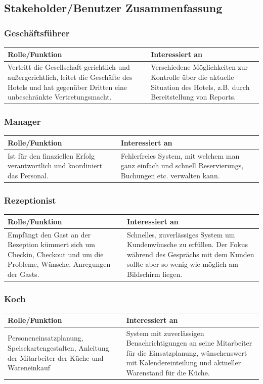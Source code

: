 \documentclass[10pt,a4paper,titlepage]{article}
\begin{document}
\subsection{Stakeholder\slash{}Benutzer Zusammenfassung}
\subsubsection{Geschäftsführer}
\begin{tabular}[t]{|p{5cm}|p{5cm}|}
    \hline
    \textbf{Rolle\slash{}Funktion} & \textbf{Interessiert an} \\
    \hline
Vertritt die Gesellschaft gerichtlich und außergerichtlich, leitet die Geschäfte des Hotels und hat gegenüber Dritten eine unbeschränkte Vertretungsmacht. &
    Verschiedene Möglichkeiten zur Kontrolle über die aktuelle Situation des Hotels, z.B. durch Bereitstellung von \Glspl{Report}.\\
    \hline
\end{tabular}
\subsubsection{Manager}
\begin{tabular}[t]{|p{5cm}|p{5cm}|}
    \hline
    \textbf{Rolle\slash{}Funktion} & \textbf{Interessiert an} \\
    \hline
Ist für den finaziellen Erfolg verantwortlich und koordiniert das Personal. &
	Fehlerfreies System, mit welchem man ganz einfach und schnell \Glspl{Reservierung}, Buchungen etc. verwalten kann. \\
    \hline
\end{tabular}
\subsubsection{\Gls{Rezeptionist}}
\begin{tabular}[t]{|p{5cm}|p{5cm}|}
    \hline
    \textbf{Rolle\slash{}Funktion} & \textbf{Interessiert an} \\
    \hline
Empfängt den \Gls{Gast} an der \Gls{Rezeption} kümmert sich um \Gls{Checkin}, \Gls{Checkout} und um die Probleme, Wünsche, Anregungen der \Glspl{Gast}. &
	Schnelles, zuverlässiges System um Kundenwünsche zu erfüllen. Der Fokus während des Gesprächs mit dem \Gls{Kunde}n sollte aber so wenig wie möglich am Bildschirm liegen. \\
    \hline
\end{tabular}
\subsubsection{Koch}
\begin{tabular}[t]{|p{5cm}|p{5cm}|}
    \hline
    \textbf{Rolle\slash{}Funktion} & \textbf{Interessiert an} \\
    \hline
Personeneinsatzplanung, Speisekartengestalten, Anleitung der \Gls{Mitarbeiter} der Küche und Wareneinkauf &
	System mit zuverlässigen Benachrichtigungen an seine \Gls{Mitarbeiter} für die Einsatzplanung, wünschenswert mit Kalendereinteilung und aktueller Warenstand für die Küche. \\
    \hline
\end{tabular}
\end{document}
